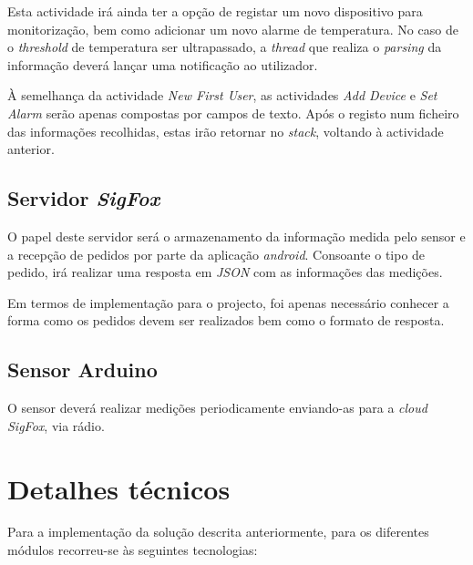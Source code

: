 \documentclass[a4paper]{article}
\begin{document}
Esta actividade irá ainda ter a opção de registar um novo dispositivo para monitorização, bem como adicionar um novo alarme de temperatura. No caso de o \textit{threshold} de temperatura ser ultrapassado, a \textit{thread} que realiza o \textit{parsing} da informação deverá lançar uma notificação ao utilizador.

À semelhança da actividade \textit{New First User}, as actividades \textit{Add Device} e \textit{Set Alarm} serão apenas compostas por campos de texto. Após o registo num ficheiro das informações recolhidas, estas irão retornar no \textit{stack}, voltando à actividade anterior.

\subsection{Servidor \textit{SigFox}}

O papel deste servidor será o armazenamento da informação medida pelo sensor e a recepção de pedidos por parte da aplicação \textit{android}. Consoante o tipo de pedido, irá realizar uma resposta em \textit{JSON} com as informações das medições.

Em termos de implementação para o projecto, foi apenas necessário conhecer a forma como os pedidos devem ser realizados bem como o formato de resposta.

\subsection{Sensor Arduino}

O sensor deverá realizar medições periodicamente enviando-as para a \textit{cloud SigFox}, via rádio.

\section{Detalhes técnicos}

Para a implementação da solução descrita anteriormente, para os diferentes módulos recorreu-se às seguintes tecnologias:
\end{document}
